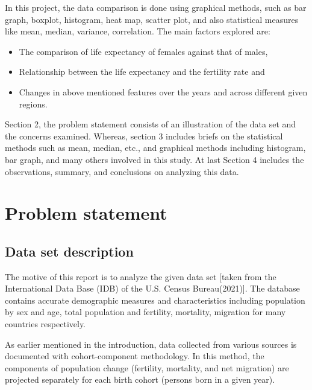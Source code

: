 \documentclass[12 pt]{scrartcl}
\begin{document}
	In this project, the data comparison is done using graphical methods, such as bar graph, boxplot, histogram, heat map, scatter plot, and also statistical measures like mean, median, variance, correlation.
	The main factors explored are:
	\begin{itemize}
		\item The comparison of life expectancy of females against that of males,
		\item Relationship between the life expectancy and the fertility rate and
		\item Changes in above mentioned features over the years and across different given regions.
	\end{itemize}
	
	Section 2, the problem statement consists of an illustration of the data set and the concerns examined. Whereas, section 3  includes briefs on the statistical methods such as mean, median, etc., and graphical methods including histogram, bar graph, and many others involved in this study. At last Section 4 includes the observations, summary, and conclusions on analyzing this data. 
	
	
	
	\section{Problem statement}
	
	\subsection{Data set description}
	
	The motive of this report is to analyze the given data set [taken from the International Data Base (IDB) of the U.S. Census Bureau(2021)]. The database contains accurate demographic measures and characteristics including population by sex and age, total population and fertility, mortality, migration for many countries respectively.
	
	As earlier mentioned in the introduction, data collected from various sources is documented with cohort-component methodology. In this method, the components of population change (fertility, mortality, and net migration) are projected separately for each birth cohort (persons born in a given year).
	
\end{document}
